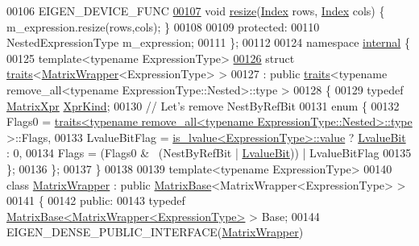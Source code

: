 \begin{DoxyCode}
00106     EIGEN\_DEVICE\_FUNC
\hyperlink{group___core___module_aaead58c7011ff95bb588d9bb242aca8a}{00107}     \textcolor{keywordtype}{void} \hyperlink{group___core___module_aaead58c7011ff95bb588d9bb242aca8a}{resize}(\hyperlink{namespace_eigen_a62e77e0933482dafde8fe197d9a2cfde}{Index} rows, \hyperlink{namespace_eigen_a62e77e0933482dafde8fe197d9a2cfde}{Index} cols) \{ m\_expression.resize(rows,cols); \}
00108 
00109   \textcolor{keyword}{protected}:
00110     NestedExpressionType m\_expression;
00111 \};
00112 
00124 \textcolor{keyword}{namespace }\hyperlink{namespaceinternal}{internal} \{
00125 \textcolor{keyword}{template}<\textcolor{keyword}{typename} ExpressionType>
\hyperlink{struct_eigen_1_1internal_1_1traits_3_01_matrix_wrapper_3_01_expression_type_01_4_01_4}{00126} \textcolor{keyword}{struct }\hyperlink{struct_eigen_1_1internal_1_1traits}{traits}<\hyperlink{group___core___module_class_eigen_1_1_matrix_wrapper}{MatrixWrapper}<ExpressionType> >
00127  : \textcolor{keyword}{public} \hyperlink{struct_eigen_1_1internal_1_1traits}{traits}<typename remove\_all<typename ExpressionType::Nested>::type >
00128 \{
00129   \textcolor{keyword}{typedef} \hyperlink{struct_eigen_1_1_matrix_xpr}{MatrixXpr} \hyperlink{struct_eigen_1_1_matrix_xpr}{XprKind};
00130   \textcolor{comment}{// Let's remove NestByRefBit}
00131   \textcolor{keyword}{enum} \{
00132     Flags0 = \hyperlink{struct_eigen_1_1internal_1_1traits}{traits<typename remove\_all<typename ExpressionType::Nested>::type}
       >::Flags,
00133     LvalueBitFlag = \hyperlink{struct_eigen_1_1internal_1_1is__lvalue}{is\_lvalue<ExpressionType>::value} ? 
      \hyperlink{group__flags_gae2c323957f20dfdc6cb8f44428eaec1a}{LvalueBit} : 0,
00134     Flags = (Flags0 & ~(NestByRefBit | \hyperlink{group__flags_gae2c323957f20dfdc6cb8f44428eaec1a}{LvalueBit})) | LvalueBitFlag
00135   \};
00136 \};
00137 \}
00138 
00139 \textcolor{keyword}{template}<\textcolor{keyword}{typename} ExpressionType>
00140 \textcolor{keyword}{class }\hyperlink{group___core___module_class_eigen_1_1_matrix_wrapper}{MatrixWrapper} : \textcolor{keyword}{public} \hyperlink{group___core___module_class_eigen_1_1_matrix_base}{MatrixBase}<MatrixWrapper<ExpressionType> >
00141 \{
00142   \textcolor{keyword}{public}:
00143     \textcolor{keyword}{typedef} \hyperlink{group___core___module_class_eigen_1_1_matrix_base}{MatrixBase<MatrixWrapper<ExpressionType>} > Base;
00144     EIGEN\_DENSE\_PUBLIC\_INTERFACE(\hyperlink{group___core___module_class_eigen_1_1_matrix_wrapper}{MatrixWrapper})

\end{DoxyCode}
